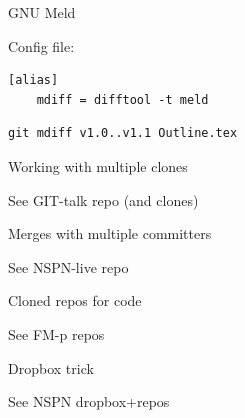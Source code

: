 \begin{frame}[fragile]{GNU Meld}

Config file:
\begin{verbatim}
[alias]
    mdiff = difftool -t meld
\end{verbatim}
  
\begin{verbatim}
git mdiff v1.0..v1.1 Outline.tex
\end{verbatim}

\end{frame}



\begin{frame}{Working with multiple clones}
  
  See GIT-talk repo (and clones)

\end{frame}



\begin{frame}{Merges with multiple committers}
  
  See NSPN-live repo

\end{frame}

\begin{frame}{Cloned repos for code}
  
  See FM-p repos

\end{frame}


\begin{frame}{Dropbox trick}
  
  See NSPN dropbox+repos

\end{frame}
















